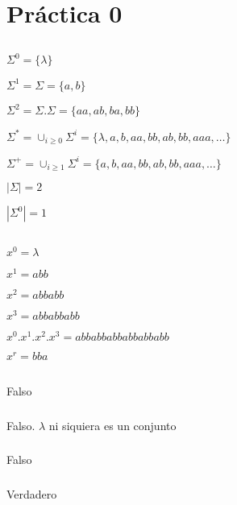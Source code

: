 \setcounter{section}{-1}
\section{Práctica 0}
\subsection{}
$\Sigma^0 = \{\lambda\}$

$\Sigma^1 = \Sigma = \{a, b\}$

$\Sigma^2 = \Sigma . \Sigma = \{aa, ab, ba, bb\}$

$\Sigma^* = \cup_{i \geq 0} \Sigma^i = \{\lambda, a, b, aa, bb, ab, bb, aaa, \ldots\}$

$\Sigma^+ = \cup_{i \geq 1} \Sigma^i = \{a, b, aa, bb, ab, bb, aaa, \ldots\}$

$|\Sigma| = 2$

$|\Sigma^0| = 1$

\subsection{}
$x^0 = \lambda$

$x^1 = abb$

$x^2 = abbabb$

$x^3 = abbabbabb$

$x^0.x^1.x^2.x^3 = abbabbabbabbabbabb$

$x^r = bba$

\subsection{}
\subsubsection{}
Falso

\subsubsection{}
Falso. $\lambda$ ni siquiera es un conjunto

\subsubsection{}
Falso

\subsubsection{}
Verdadero

